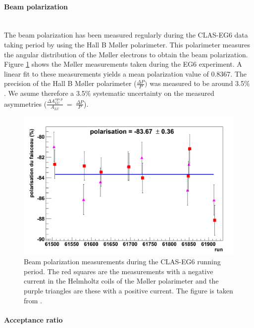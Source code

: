 \paragraph{Beam polarization}
~\\
   
The beam polarization has been measured regularly during the CLAS-EG6 data 
taking period by using the Hall B M\o ller polarimeter. This polarimeter 
measures the angular distribution of the M\o ller electrons to obtain the beam 
polarization. Figure \ref{fig:beam_polarization} shows the M\o ller 
measurements taken during the EG6 experiment. A linear fit to these 
measurements yields a mean polarization value of 0.8367. The precision of the 
Hall B M\o ller polarimeter ($\frac{\Delta P}{P})$ was measured to be around 
3.5$\%$ \cite{hallb_polarimeter}. We asume therefore a 3.5$\%$ systematic 
uncertainty on the measured asymmetries ($\frac{\Delta A^{sys.  
p}_{LU}}{A_{LU}}$~=~$\frac{\Delta P}{P}$).

\begin{figure}[tp]
\centering
\includegraphics[scale=0.25]{fig_dvcs/beam_polarization.png}
\caption{Beam polarization measurements during the CLAS-EG6 running period.  
The red squares are the measurements with a negative current in the Helmholtz 
coils of the M\o ller polarimeter and the purple triangles are these with a 
positive current. The figure is taken from \cite{yohann}.} 
\label{fig:beam_polarization}
\end{figure}


\paragraph{Acceptance ratio}
~\\

